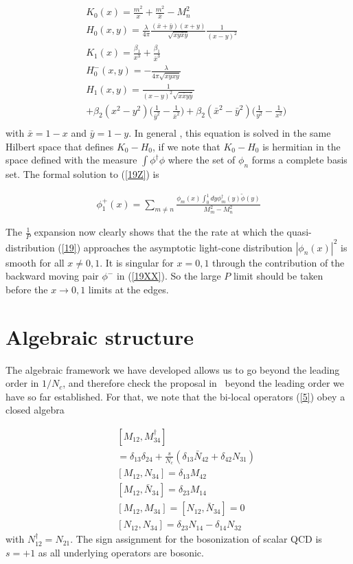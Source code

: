 \documentclass[showpacs,twocolumn,aps,preprintnumbers,letterpaper]{revtex4}
\newcommand{\be}{\begin{equation}}
\newcommand{\ee}{\end{equation}}
\def\be{\begin{eqnarray}}
\def\ee{\end{eqnarray}}
\begin{document}
\be
\label{19Z}
&&K_0(x)=\frac{m^2}{x}+\frac{m^2}{\bar x}-M_n^2\nonumber\\
&&H_0(x,y)=\frac{\lambda}{4\pi}\frac{(\bar x+\bar y)(x+y)}{\sqrt{xy\bar x\bar y}}\frac 1{(x-y)^2}\nonumber\\
&&K_1(x)=\frac{\beta_1}{x^3}+\frac{\beta_1}{\bar x^3}\nonumber\\
&&H_0^-(x,y)=-\frac{\lambda}{4\pi\sqrt{xy\bar x \bar y}}\nonumber\\
&&H_1(x,y)=\frac 1{(x-y)^2\sqrt{x\bar xy\bar y}}\nonumber \\ 
&&+\beta_2(x^2-y^2)\bigg(\frac{1}{\bar y^2}-\frac{1}{\bar x^2}\bigg)+\beta_2(\bar x^2-\bar y^2)\bigg(\frac{1}{y^2}-\frac{1}{x^2}\bigg)\nonumber\\
\ee
with $\bar x=1-x$ and $\bar y =1-y$.
In general , this equation is solved in the same Hilbert space that defines $K_0-H_0$, 
if we note that $K_0-H_0$ is hermitian in the space defined with the measure
$\int \phi^{\dagger}\phi$ where the set of $\phi_n$ forms a complete basis set. The formal solution to
(\ref{19Z}) is



\be
\phi_1^{+}(x)=\sum_{m \ne n}\frac{\phi_m(x)\int_0^1 dy \phi_m^{\dagger}(y) \tilde \phi(y)}{M_m^2-M_n^2}
\ee


The $\frac 1P$ expansion now clearly shows that the the rate at which the quasi-distribution (\ref{19}) 
approaches the asymptotic light-cone distribution $|\phi_n(x)|^2$ is smooth for all $x\neq 0, 1$. It is singular for $x=0,1$
through the contribution of the backward moving pair $\phi^-$ in (\ref{19XX}). So the large $P$ limit should
be taken before the $x\rightarrow 0,1$ limits at the edges.


\section{Algebraic structure}

The algebraic framework we have developed allows us to go beyond the leading order in $1/N_c$,
and therefore check the proposal in~\cite{JI1} beyond the leading order we have so far established. 
For that, we note that the bi-local operators (\ref{5}) obey a closed algebra


\be
\label{20}
&&[M_{12},M^{\dagger}_{34}]\nonumber \\ 
&&=\delta_{13}\delta_{24}+ \frac{s}{N_c}(\delta_{13}\bar N_{42}+\delta_{42}N_{31})\nonumber\\
&&[M_{12},N_{34}]=\delta_{13}M_{42}\nonumber\\
&&[M_{12},\bar N_{34}]=\delta_{23}M_{14}\nonumber\\
&&[M_{12},M_{34}]=[N_{12},\bar N_{34}]=0\nonumber\\
&&[N_{12},N_{34}]=\delta_{23}N_{14}-\delta_{14}N_{32}
\ee
with $N^{\dagger}_{12}=N_{21}$. The sign assignment for the bosonization of scalar QCD is $s=+1$
as all underlying operators are bosonic.
\end{document}

